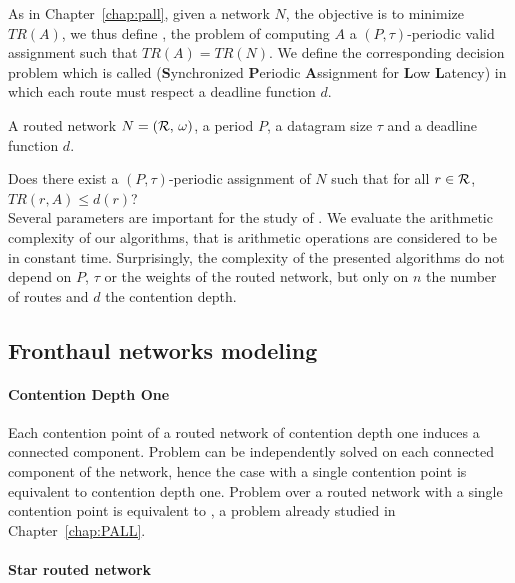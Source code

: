   As in Chapter~\ref{chap:pall}, given a network $N$, the objective is to minimize $TR(A)$, we thus define \minstra, the problem of computing $A$ a $(P,\tau)$-periodic valid assignment such that $TR(A) = TR(N)$. We define the corresponding decision problem which is called \spall (\textbf{S}ynchronized \textbf{P}eriodic \textbf{A}ssignment for \textbf{L}ow \textbf{L}atency) in which each route must respect a deadline function $d$.


        A routed network $N = ({\cal R},\,\omega)$, a period $P$, a datagram size $\tau$ and a deadline function $d$.%
      

       Does there exist a $(P,\tau)$-periodic assignment of $N$ such that for all $r \in {\cal R}$, $TR(r,A) \leq d(r)$?
      \\
    
    Several parameters are important for the study of \spall. We evaluate the arithmetic complexity of our algorithms, that is arithmetic operations are considered to be in constant time. Surprisingly, the complexity of the presented algorithms do not depend on $P$, $\tau$ or the weights of the routed network, but only on $n$ the number of routes and $d$ the contention depth.

\subsection{Fronthaul networks modeling}\label{sec:fronthaul}

\paragraph*{Contention Depth One}

Each contention point of a routed network of contention depth one induces a connected component. 
Problem \spall can be independently solved on each connected component of the network, hence the case with a single contention point is equivalent to contention depth one. Problem \spall over a routed network with a single contention point is equivalent to \wta, a problem already studied in Chapter~\ref{chap:PALL}. 

\paragraph*{Star routed network}


